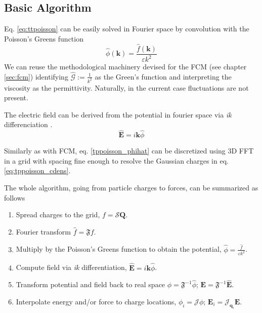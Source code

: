 \documentclass[ twoside,openright,titlepage,numbers=noenddot,%
headinclude,footinclude,cleardoublepage=empty,abstract=on,
BCOR=5mm,paper=a4,fontsize=11pt, dvipsnames
]{scrreprt}
\renewcommand{\vec}[1]{\bm{#1}}
\newcommand{\oper}[1]{\mathcal{#1}}
\newcommand{\fou}[1]{\widehat{#1}}
\newcommand{\ppos}{q}
\begin{document}
\subsection*{Basic Algorithm}
Eq. \eqref{eq:ttpoisson} can be easily solved in Fourier space by convolution with the Poisson's Greens function 
\begin{equation}
  \label{tppoisson_phihat}
 \hat\phi(\vec{k}) = \frac{\hat f(\vec{k})}{\varepsilon k^2}
\end{equation}
We can reuse the methodological machinery devised for the \gls{FCM} (see chapter \ref{sec:fcm}) identifying $\fou{\oper{G}} := \frac{1}{k^2}$ as the Green's function and interpreting the viscosity as the permittivity. Naturally, in the current case fluctuations are not present.

The electric field can be derived from the potential in fourier space via \emph{ik} differenciation \cite{ikdiff}.
\begin{equation}
    \label{tppoisson_ehat}
  \hat{\vec{E}} = i\vec{k}\hat{\phi}
\end{equation}

Similarly as with \gls{FCM}, eq. \eqref{tppoisson_phihat} can be discretized using 3D \gls{FFT} in a grid with spacing fine enough to resolve the Gaussian charges in eq. \eqref{eq:tppoisson_cdens}.

The whole algorithm, going from particle charges to forces, can be summarized as follows
\begin{enumerate}
\item Spread charges to the grid, $f=\oper{S}\vec{Q}$.
\item Fourier transform $\hat{f} = \mathfrak{F}f$.
\item Multiply by the Poisson's Greens function to obtain the potential, $\fou{\phi} = \frac{\hat{f}}{\varepsilon k^2}$.
\item Compute field via \emph{ik} differentiation, $\fou{\vec{E}} = i\vec{k}\fou\phi$.
\item Transform potential and field back to real space $\phi = \mathfrak{F}^{-1}\fou\phi$; $\vec{E} = \mathfrak{F}^{-1}\fou{\vec{E}}$.
\item Interpolate energy and/or force to charge locations, $\phi_i = \oper{J}\phi$; $\vec{E}_i = \oper{J}_{\vec{\ppos}_i}\vec{E}$.
\end{enumerate}
\end{document}
